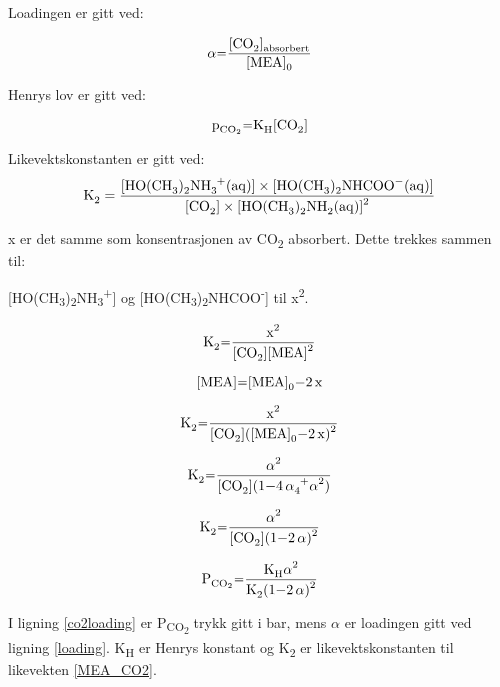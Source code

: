 
Loadingen er gitt ved: 

\begin{equation}
    \ce{\alpha = \frac{[CO_{2}]_{absorbert}}{[MEA]_{0}}}
    \label{loading}
\end{equation}

Henrys lov er gitt ved:

\begin{equation}
    \ce{p_{CO_{2}}= K_{H}[CO_{2}]}
    \label{Henrys}
\end{equation}

Likevektskonstanten er gitt ved: 
\begin{equation}
    \ce{K_2 = \frac{[HO(CH_3)_2NH_3^+(aq)]\times[HO(CH_3)_2NHCOO^-(aq)]}{[CO_2]\times[HO(CH_3)_2NH_2(aq)]^2}}
    \label{likevekt}
\end{equation}

x er det samme som konsentrasjonen av CO\textsubscript{2} absorbert. Dette trekkes sammen til:

[HO(CH\textsubscript{3})\textsubscript{2}NH\textsubscript{3}\textsuperscript{+}] og [HO(CH\textsubscript{3})\textsubscript{2}NHCOO\textsuperscript{-}] til x\textsuperscript{2}. 

\begin{equation*}
    \ce{K_2=\frac{x^2}{[CO_2][MEA]^2}}
\end{equation*}

\begin{equation*}
    \ce{[MEA]=[MEA]_0-2x}
\end{equation*}

\begin{equation*}
    \ce{K_2= \frac{x^2}{[CO_2]([MEA]_0-2x)^2}}
\end{equation*}


\begin{equation*}
    \ce{K_2=\frac{\alpha^2}{[CO_2](1-4\alpha+4\alpha^2)}}
\end{equation*}

\begin{equation*}
    \ce{K_2=\frac{\alpha^2}{[CO_2](1-2\alpha)^2}}
\end{equation*}

\begin{equation}
    \ce{P_{CO_2}=\frac{K_H\alpha^2}{K_2(1-2\alpha)^2}}
    \label{co2loading}
\end{equation}

I ligning \ref{co2loading} er P\textsubscript{CO\textsubscript{2}} trykk gitt i bar, mens $\alpha$ er loadingen gitt ved ligning \ref{loading}. K\textsubscript{H} er Henrys konstant og K\textsubscript{2} er likevektskonstanten til likevekten \ref{MEA_CO2}.
